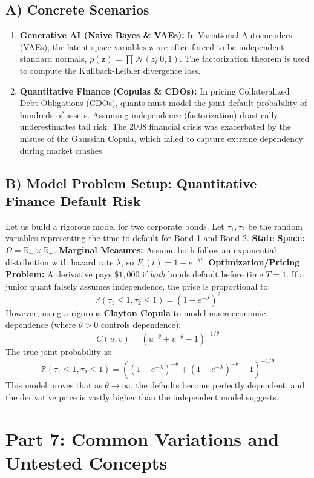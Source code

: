 \documentclass[11pt, a4paper]{article}
\theoremstyle{definition}
\theoremstyle{remark}
\newcommand{\R}{\mathbb{R}}
\newcommand{\Prob}{\mathbb{P}}
\begin{document}
\subsection{A) Concrete Scenarios}
\begin{enumerate}
    \item \textbf{Generative AI (Naive Bayes \& VAEs):} In Variational Autoencoders (VAEs), the latent space variables $\mathbf{z}$ are often forced to be independent standard normals, $p(\mathbf{z}) = \prod \mathcal{N}(z_i | 0, 1)$. The factorization theorem is used to compute the Kullback-Leibler divergence loss.
    \item \textbf{Quantitative Finance (Copulas \& CDOs):} In pricing Collateralized Debt Obligations (CDOs), quants must model the joint default probability of hundreds of assets. Assuming independence (factorization) drastically underestimates tail risk. The 2008 financial crisis was exacerbated by the misuse of the Gaussian Copula, which failed to capture extreme dependency during market crashes.
\end{enumerate}

\subsection{B) Model Problem Setup: Quantitative Finance Default Risk}
Let us build a rigorous model for two corporate bonds. Let $\tau_1, \tau_2$ be the random variables representing the time-to-default for Bond 1 and Bond 2.
\textbf{State Space:} $\Omega = \R_+ \times \R_+$.
\textbf{Marginal Measures:} Assume both follow an exponential distribution with hazard rate $\lambda$, so $F_i(t) = 1 - e^{-\lambda t}$.
\textbf{Optimization/Pricing Problem:} A derivative pays $\$1,000$ if \textit{both} bonds default before time $T=1$. 
If a junior quant falsely assumes independence, the price is proportional to:
\[ \Prob(\tau_1 \le 1, \tau_2 \le 1) = (1 - e^{-\lambda})^2 \]
However, using a rigorous \textbf{Clayton Copula} to model macroeconomic dependence (where $\theta > 0$ controls dependence):
\[ C(u, v) = (u^{-\theta} + v^{-\theta} - 1)^{-1/\theta} \]
The true joint probability is:
\[ \Prob(\tau_1 \le 1, \tau_2 \le 1) = \left( (1 - e^{-\lambda})^{-\theta} + (1 - e^{-\lambda})^{-\theta} - 1 \right)^{-1/\theta} \]
This model proves that as $\theta \to \infty$, the defaults become perfectly dependent, and the derivative price is vastly higher than the independent model suggests.

\newpage
\section{Part 7: Common Variations and Untested Concepts}
\end{document}
